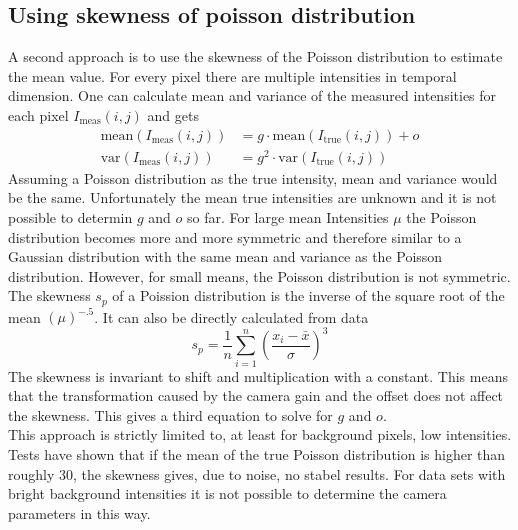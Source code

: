 \subsection{Using skewness of poisson distribution}
A second approach is to use the skewness of the Poisson distribution to estimate the mean value.\newline
For every pixel there are multiple intensities in temporal dimension. One can
calculate mean and variance of the measured intensities for each pixel $I_\text{meas}(i,j)$ and
gets
\begin{align}
	\text{mean}(I_\text{meas}(i,j))& = g\cdot \text{mean}(I_\text{true}(i,j)) + o \label{meanvarPoiss1}\\
	\text{var}(I_\text{meas}(i,j))& = g^2\cdot\text{var}(I_\text{true}(i,j)) \label{meanvarPoiss2}
\end{align}
Assuming a Poisson distribution as the true intensity, mean and variance would
be the same. Unfortunately the mean true intensities are unknown and it is
not possible to determin $g$ and $o$ so far. For large mean Intensities $\mu$
the Poisson distribution becomes more and more symmetric and therefore similar to a Gaussian distribution
with the same mean and variance as the Poisson distribution. However, for small means, the Poisson distribution is not
symmetric. The skewness $s_p$ of a Poission distribution is the inverse of the
square root of the mean $(\mu)^{-.5}$. It can also be directly
calculated from data
\begin{equation}
	s_p = \frac{1}{n}\sum_{i = 1}^n \left(\frac{x_i - \bar x}{\sigma}\right)^3
\end{equation}
The skewness is invariant to shift and multiplication with a constant. This
means that the transformation caused by the camera gain and the offset
does not affect the skewness. This gives a third equation to solve for $g$ and
$o$.\\
This approach is strictly limited to, at least for background pixels, low intensities. Tests have shown that if the mean of the true Poisson distribution is higher than roughly 30, the skewness gives, due to noise, no stabel results. For data sets with bright background intensities it is not possible to determine the camera parameters in this way.

